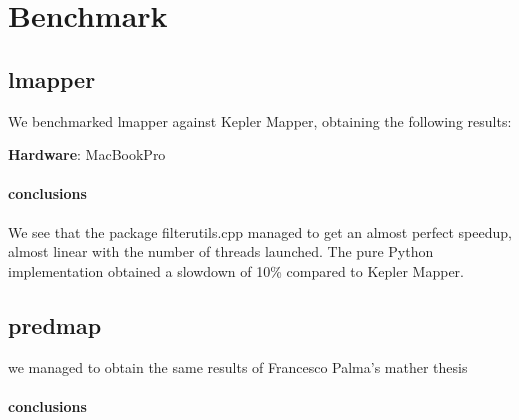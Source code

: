 \section{Benchmark}

\subsection{lmapper}
We benchmarked lmapper against Kepler Mapper, obtaining the following results:

\textbf{Hardware}:
MacBookPro

\paragraph{conclusions}
We see that the package filterutils.cpp managed to get an almost perfect speedup, almost linear with the number of threads launched.
The pure Python implementation obtained a slowdown of 10\% compared to Kepler Mapper.  
\subsection{predmap}
we managed to obtain the same results of Francesco Palma's mather thesis

\paragraph{conclusions}